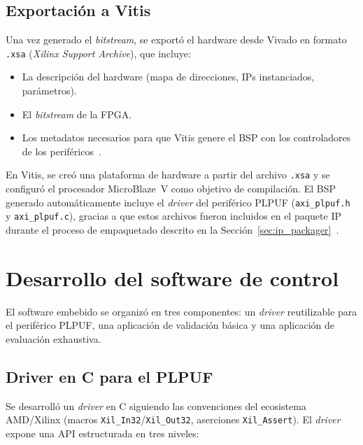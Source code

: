 \subsection{Exportación a Vitis}
\label{sec:export_xsa}

Una vez generado el \textit{bitstream}, se exportó el hardware desde Vivado
en formato \texttt{.xsa} (\textit{Xilinx Support Archive}), que incluye:

\begin{itemize}
  \item La descripción del hardware (mapa de direcciones, IPs instanciados,
    parámetros).
  \item El \textit{bitstream} de la FPGA.
  \item Los metadatos necesarios para que Vitis genere el BSP con los
    controladores de los periféricos~\cite{ug1701}.
\end{itemize}

En Vitis, se creó una plataforma de hardware a partir del archivo
\texttt{.xsa} y se configuró el procesador MicroBlaze~V como objetivo de
compilación. El BSP generado automáticamente incluye el \textit{driver}
del periférico PLPUF (\texttt{axi\_plpuf.h} y \texttt{axi\_plpuf.c}), gracias
a que estos archivos fueron incluidos en el paquete IP durante el proceso de
empaquetado descrito en la Sección~\ref{sec:ip_packager}~\cite{ug1701}.

\section{Desarrollo del software de control}
\label{sec:software}

El software embebido se organizó en tres componentes: un \textit{driver}
reutilizable para el periférico PLPUF, una aplicación de validación básica
y una aplicación de evaluación exhaustiva.

\subsection{Driver en C para el PLPUF}
\label{sec:driver}

Se desarrolló un \textit{driver} en C siguiendo las convenciones del
ecosistema AMD/Xilinx (macros \texttt{Xil\_In32}/\texttt{Xil\_Out32},
aserciones \texttt{Xil\_Assert}). El \textit{driver} expone una API
estructurada en tres niveles:

